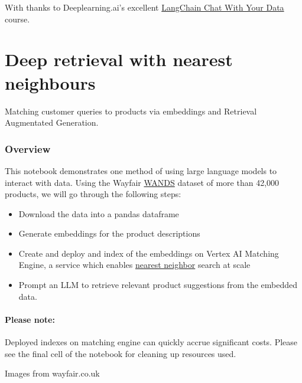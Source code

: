 \documentclass[
  letterpaper,
  DIV=11,
  numbers=noendperiod]{scrreprt}
\begin{document}
With thanks to Deeplearning.ai's excellent
\href{https://learn.deeplearning.ai/langchain-chat-with-your-data/lesson/1/introduction}{LangChain
Chat With Your Data} course.

\hypertarget{deep-retrieval-with-nearest-neighbours}{%
\chapter{Deep retrieval with nearest
neighbours}\label{deep-retrieval-with-nearest-neighbours}}

Matching customer queries to products via embeddings and Retrieval
Augmentated Generation.

\hypertarget{overview-1}{%
\subsection{Overview}\label{overview-1}}

This notebook demonstrates one method of using large language models to
interact with data. Using the Wayfair
\href{https://www.aboutwayfair.com/careers/tech-blog/wayfair-releases-wands-the-largest-and-richest-publicly-available-dataset-for-e-commerce-product-search-relevance}{WANDS}
dataset of more than 42,000 products, we will go through the following
steps:

\begin{itemize}
\item
  Download the data into a pandas dataframe
\item
  Generate embeddings for the product descriptions
\item
  Create and deploy and index of the embeddings on Vertex AI Matching
  Engine, a service which enables
  \href{https://en.wikipedia.org/wiki/Nearest_neighbor_search}{nearest
  neighbor} search at scale
\item
  Prompt an LLM to retrieve relevant product suggestions from the
  embedded data.
\end{itemize}

\hypertarget{please-note}{%
\subsubsection{Please note:}\label{please-note}}

Deployed indexes on matching engine can quickly accrue significant
costs. Please see the final cell of the notebook for cleaning up
resources used.

Images from wayfair.co.uk
\end{document}

